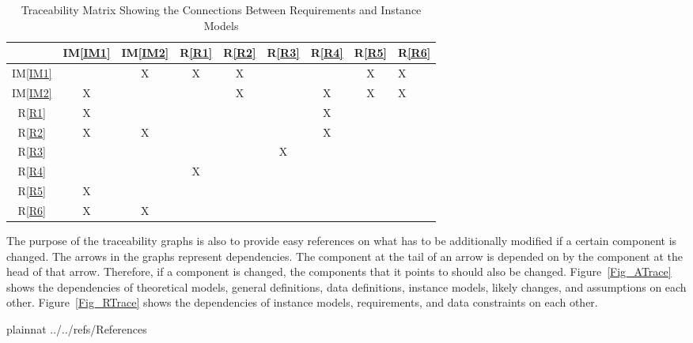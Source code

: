 \documentclass[12pt]{article}
\newcommand{\iref}[1]{IM\ref{#1}}
\newcommand{\rref}[1]{R\ref{#1}}
\begin{document}
\begin{table}[h!]
  \centering
  \begin{tabular}{|c|c|c|c|c|c|c|c|}
    \hline
                           & \iref{IM1} & \iref{IM2}  & \rref{R1} & \rref{R2} & \rref{R3} & \rref{R4} & \rref{R5} & \rref{R6} \\
    \hline
    \iref{IM1}            &             & X           &      X         &    X           &                           &              & X         & X         \\ \hline
    \iref{IM2}            & X           &             &               & X             &                           & X                  &    X     & X           \\ \hline
    \rref{R1}     &           X  &             &               &               &                           &            X        &              &              \\ \hline
    \rref{R2}    &           X  &  X           &               &               &                           & X                  &             &               \\ \hline
    \rref{R3}   &             &             &               &               & X                         &                    &             &               \\ \hline
    \rref{R4}  &     &            &     X          &               &                           &                  &             &              \\ \hline
    \rref{R5}     & X           &             &               &               &                           &                    &            &                \\ \hline
    \rref{R6}       &   X          & X           &               &               &                           &                    &          &                  \\ \hline
  \end{tabular}
  \caption{Traceability Matrix Showing the Connections Between Requirements and Instance Models}
  \label{Table:R_trace}
\end{table}

The purpose of the traceability graphs is also to provide easy references on
what has to be additionally modified if a certain component is changed.  The
arrows in the graphs represent dependencies. The component at the tail of an
arrow is depended on by the component at the head of that arrow. Therefore, if a
component is changed, the components that it points to should also be
changed. Figure~\ref{Fig_ATrace} shows the dependencies of theoretical models,
general definitions, data definitions, instance models, likely changes, and
assumptions on each other. Figure~\ref{Fig_RTrace} shows the dependencies of
instance models, requirements, and data constraints on each other.


\newpage

 {plainnat}
 {../../refs/References}
\end{document}
